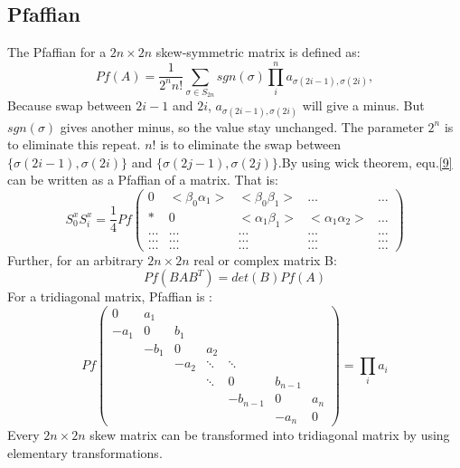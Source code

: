 \documentclass[UTF8]{ctexart}
\begin{document}
\subsection{Pfaffian}
The Pfaffian for a $2n\times2n$ skew-symmetric matrix is defined as:
\begin{equation}
\label{10}
Pf(A)=\frac{1}{2^nn!}\sum_{\sigma \in S_{2n}}sgn(\sigma)\prod_i^na_{{\sigma(2i-1)},\sigma(2i)},
\end{equation}
Because swap between $2i-1$ and $2i$, $a_{\sigma(2i-1),\sigma(2i)}$ will give a minus. But $sgn(\sigma)$ gives another minus, so the value stay unchanged. The parameter $2^n$ is to eliminate this repeat. $n!$ is to eliminate the swap between $\{\sigma(2i-1),\sigma(2i)\}$ and $\{\sigma(2j-1),\sigma(2j)\}$.By using wick theorem, equ.\ref{9} can be written as a Pfaffian of a matrix. That is:
\begin{equation}
\label{11}
S_0^xS_i^x=\frac{1}{4}Pf
\begin{pmatrix}
0&<\beta_0\alpha_1>&<\beta_0\beta_1>&\ldots&\ldots\\
*&0&<\alpha_1\beta_1>&<\alpha_1\alpha_2>&\ldots\\
\ldots&\ldots&\ldots&\ldots&\ldots\\
\ldots&\ldots&\ldots&\ldots&\ldots\\
\ldots&\ldots&\ldots&\ldots&\ldots
\end{pmatrix}
\end{equation} 
Further, for an arbitrary $2n\times2n$ real or complex matrix B:
\begin{equation}
\label{12}
Pf(BAB^T)=det(B)Pf(A)
\end{equation}
For a tridiagonal matrix, Pfaffian is :
\begin{equation}
\label{13}
Pf
\begin{pmatrix}
0&a_1& & & & &\\
-a_1&0&b_1& & & &\\
 &-b_1&0&a_2& & &\\
 & &-a_2&\ddots&\ddots& &\\
 & & &\ddots&0&b_{n-1}& \\
 & & & &-b_{n-1}&0&a_n\\
 & & & & &-a_n&0
\end{pmatrix}
=\prod_ia_i
\end{equation}
Every $2n\times2n$ skew matrix can be transformed into tridiagonal matrix by using elementary transformations.
\end{document}
